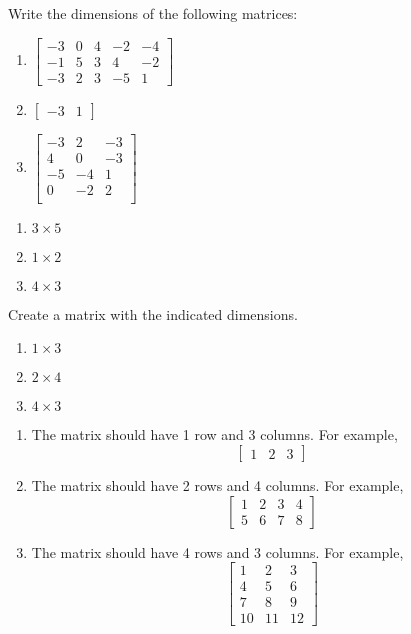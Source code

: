 \begin{Exercise}[title = {Matrix Dimensions 1}, label = mat_dim1]
Write the dimensions of the following matrices:
\begin{enumerate}
\item $\begin{bmatrix}
-3 & 0 & 4 & -2 & -4\\
-1 & 5 & 3 & 4 & -2\\
-3 & 2 & 3 & -5 & 1
\end{bmatrix}$
\item $\begin{bmatrix}
-3 & 1
\end{bmatrix}$
\item $\begin{bmatrix}
-3 & 2 & -3\\
4 & 0 & -3\\
-5 & -4 & 1\\
0 & -2 & 2\\
\end{bmatrix}$
\end{enumerate}
\end{Exercise}

\begin{Answer}[ref = mat_dim1]
\begin{enumerate}
\item $3 \times 5$
\item $1 \times 2$
\item $4 \times 3$
\end{enumerate}
\end{Answer}

\begin{Exercise}[title = {Matrix Dimensions 2}, label = mat_dim2]
Create a matrix with the indicated dimensions.
\begin{enumerate}
\item $1 \times 3$
\item $2 \times 4$
\item $4 \times 3$
\end{enumerate}
\end{Exercise}

\begin{Answer}[ref = mat_dim2]
\begin{enumerate}
\item The matrix should have 1 row and 3 columns. For example, 
$$\begin{bmatrix}
1 & 2 & 3
\end{bmatrix}$$
\item The matrix should have 2 rows and 4 columns. For example,
$$\begin{bmatrix}
1 & 2 & 3 & 4\\
5 & 6 & 7 & 8
\end{bmatrix}$$
\item The matrix should have 4 rows and 3 columns. For example,
$$\begin{bmatrix}
1 & 2 & 3\\
4 & 5 & 6\\
7& 8 & 9\\
10 & 11 & 12
\end{bmatrix}$$
\end{enumerate}
\end{Answer}

